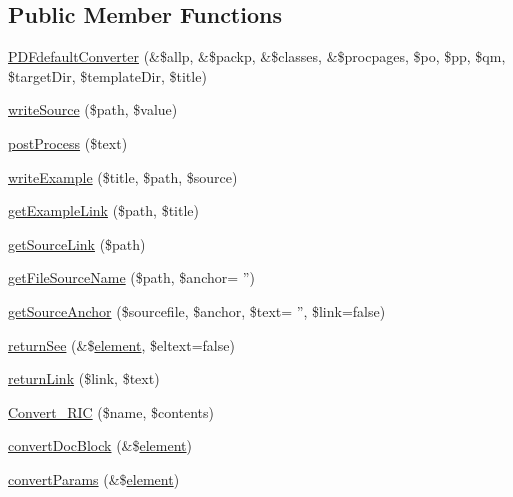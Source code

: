 \subsection*{\-Public \-Member \-Functions}
\begin{DoxyCompactItemize}
\item 
\hyperlink{class_p_d_fdefault_converter_a3b415ef1b8d95c47936387034c8a7da9}{\-P\-D\-Fdefault\-Converter} (\&\$allp, \&\$packp, \&\$classes, \&\$procpages, \$po, \$pp, \$qm, \$target\-Dir, \$template\-Dir, \$title)
\item 
\hyperlink{class_p_d_fdefault_converter_abd54588ec4cf2a0c5d087031485f932e}{write\-Source} (\$path, \$value)
\item 
\hyperlink{class_p_d_fdefault_converter_a0b2058070d303b4d06535be248b021ab}{post\-Process} (\$text)
\item 
\hyperlink{class_p_d_fdefault_converter_a757f70385404e298a4c053d6b7d1be28}{write\-Example} (\$title, \$path, \$source)
\item 
\hyperlink{class_p_d_fdefault_converter_a26b4615e9204cd081dd51fd0367bf4d6}{get\-Example\-Link} (\$path, \$title)
\item 
\hyperlink{class_p_d_fdefault_converter_a606ad911462a36f943313ed5475db5dc}{get\-Source\-Link} (\$path)
\item 
\hyperlink{class_p_d_fdefault_converter_ae5fb4eaf365f515ef23c3c830d9f8ffd}{get\-File\-Source\-Name} (\$path, \$anchor= '')
\item 
\hyperlink{class_p_d_fdefault_converter_a0cc7c24f111109ea1d8559681ecd6b77}{get\-Source\-Anchor} (\$sourcefile, \$anchor, \$text= '', \$link=false)
\item 
\hyperlink{class_p_d_fdefault_converter_a719352e3241c21f97773e6553539dc69}{return\-See} (\&\$\hyperlink{bug-904820_8php_aa94081298ab2dfd0f261cce6c203d9aa}{element}, \$eltext=false)
\item 
\hyperlink{class_p_d_fdefault_converter_af40fcd39ab514ae82e555a451dd72dc2}{return\-Link} (\$link, \$text)
\item 
\hyperlink{class_p_d_fdefault_converter_ad3f7aa571c77bab78c11f387be1ec587}{\-Convert\-\_\-\-R\-I\-C} (\$name, \$contents)
\item 
\hyperlink{class_p_d_fdefault_converter_a7ede78cf73577dac6b466151ae0ca99f}{convert\-Doc\-Block} (\&\$\hyperlink{bug-904820_8php_aa94081298ab2dfd0f261cce6c203d9aa}{element})
\item 
\hyperlink{class_p_d_fdefault_converter_af4a49f1c1de9c92fef2af50d0849add7}{convert\-Params} (\&\$\hyperlink{bug-904820_8php_aa94081298ab2dfd0f261cce6c203d9aa}{element})

\end{DoxyCompactItemize}
